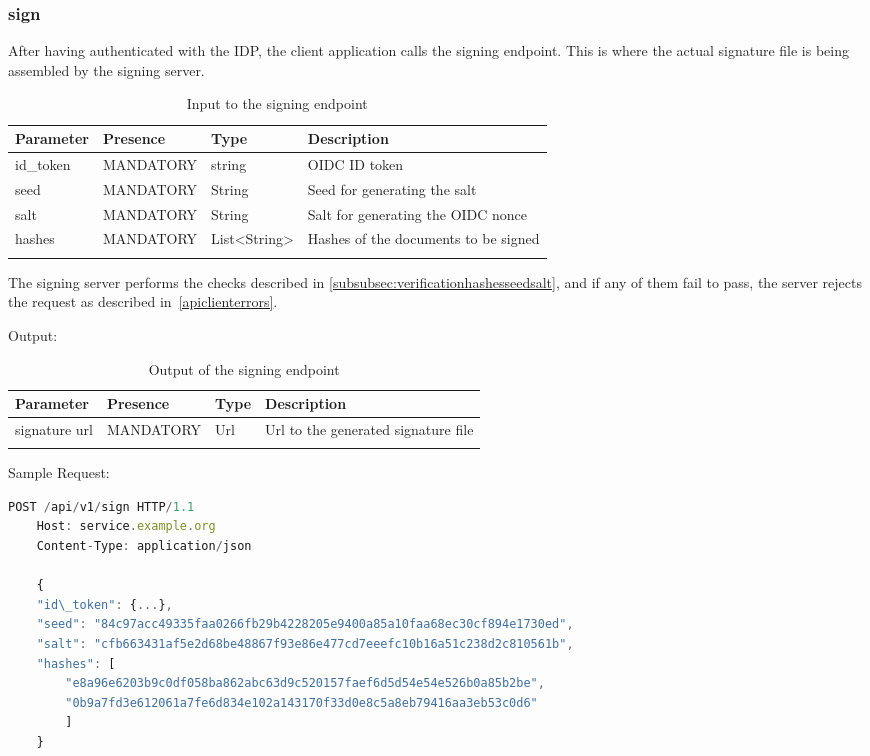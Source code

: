 \subsubsection{sign}\label{subsubsec:signrequest}
After having authenticated with the IDP, the client application calls the signing endpoint.
This is where the actual signature file is being assembled by the signing server.

\begin{longtable}{|l|l|l|l|}
    \hline
    \textbf{Parameter} & \textbf{Presence} & \textbf{Type} & \textbf{Description} \\ \hline
    id\_token & MANDATORY & string & OIDC ID token \\ \hline
    seed & MANDATORY & String & Seed for generating the salt \\ \hline
    salt & MANDATORY & String & Salt for generating the OIDC nonce \\ \hline
    hashes & MANDATORY & List<String> & Hashes of the documents to be signed \\ \hline
    \caption{Input to the signing endpoint}
\end{longtable}

The signing server performs the checks described in \ref{subsubsec:verificationhashesseedsalt},
and if any of them fail to pass,
the server rejects the request as described in~\ref{apiclienterrors}.

Output:

\begin{longtable}{|l|l|l|l|}
    \hline
    \textbf{Parameter} & \textbf{Presence} & \textbf{Type} & \textbf{Description} \\ \hline
    signature url & MANDATORY & Url & Url to the generated signature file\\ \hline
    \caption{Output of the signing endpoint}
\end{longtable}

Sample Request:
\begin{lstlisting}[caption={sign request}, captionpos=b, language=JavaScript, label={lst:signrequest}]
    POST /api/v1/sign HTTP/1.1
    Host: service.example.org
    Content-Type: application/json

    {
    "id\_token": {...},
    "seed": "84c97acc49335faa0266fb29b4228205e9400a85a10faa68ec30cf894e1730ed",
    "salt": "cfb663431af5e2d68be48867f93e86e477cd7eeefc10b16a51c238d2c810561b",
    "hashes": [
        "e8a96e6203b9c0df058ba862abc63d9c520157faef6d5d54e54e526b0a85b2be",
        "0b9a7fd3e612061a7fe6d834e102a143170f33d0e8c5a8eb79416aa3eb53c0d6"
        ]
    }
\end{lstlisting}

